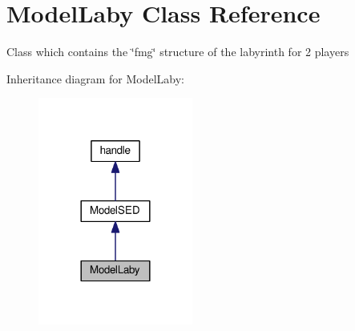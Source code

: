 \hypertarget{class_model_laby}{}\section{Model\+Laby Class Reference}
\label{class_model_laby}


Class which contains the \char`\"{}fmg\char`\"{} structure of the labyrinth for 2 players  




Inheritance diagram for Model\+Laby\+:
\nopagebreak
\begin{figure}[H]
\begin{center}
\leavevmode
\includegraphics[width=144pt]{class_model_laby__inherit__graph}
\end{center}
\end{figure}
